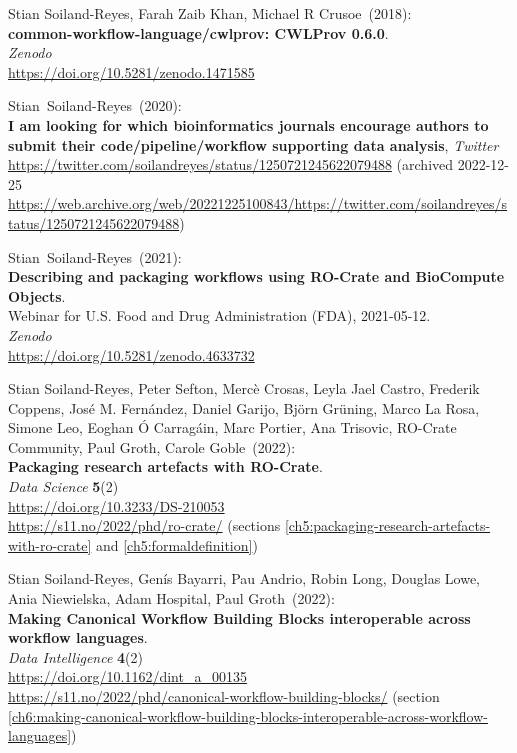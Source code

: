 \begin{thebibliography}{9}
Stian Soiland-Reyes, Farah Zaib Khan, Michael R Crusoe~(2018): \\
\textbf{common-workflow-language/cwlprov: CWLProv 0.6.0}.\\
\emph{Zenodo}\\
\url{https://doi.org/10.5281/zenodo.1471585}

Stian~Soiland-Reyes~(2020): \\
\textbf{I am looking for which bioinformatics journals encourage authors
to submit their code/pipeline/workflow supporting data analysis},
\emph{Twitter}\\
\url{https://twitter.com/soilandreyes/status/1250721245622079488}
(archived 2022-12-25 
\url{https://web.archive.org/web/20221225100843/https://twitter.com/soilandreyes/status/1250721245622079488})

Stian~Soiland-Reyes~(2021): \\
\textbf{Describing and packaging workflows using RO-Crate and BioCompute Objects}.\\
Webinar for U.S. Food and Drug Administration
(FDA), 2021-05-12.\\
\emph{Zenodo}\\
\url{https://doi.org/10.5281/zenodo.4633732}

Stian Soiland-Reyes, Peter Sefton, Mercè
Crosas, Leyla Jael Castro, Frederik Coppens, José M. Fernández, Daniel
Garijo, Björn Grüning, Marco La Rosa, Simone Leo, Eoghan Ó Carragáin,
Marc Portier, Ana Trisovic, RO-Crate Community, Paul Groth, Carole Goble~(2022): \\
\textbf{Packaging research artefacts with RO-Crate}.\\
\emph{Data Science} \textbf{5}(2)\\
\url{https://doi.org/10.3233/DS-210053}\\
\url{https://s11.no/2022/phd/ro-crate/}
(sections \vref{ch5:packaging-research-artefacts-with-ro-crate} and \vref{ch5:formaldefinition})

Stian Soiland-Reyes, Genís Bayarri, Pau
Andrio, Robin Long, Douglas Lowe, Ania Niewielska, Adam Hospital, Paul
Groth~(2022): \\
\textbf{Making Canonical Workflow Building Blocks interoperable across workflow languages}.\\
\emph{Data Intelligence} \textbf{4}(2)\\
\url{https://doi.org/10.1162/dint_a_00135}\\
\url{https://s11.no/2022/phd/canonical-workflow-building-blocks/}
(section \vref{ch6:making-canonical-workflow-building-blocks-interoperable-across-workflow-languages})


\end{thebibliography}
